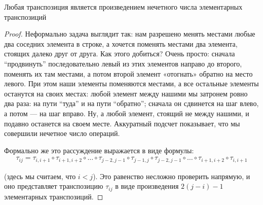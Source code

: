 \begin{theorem-non}
    Любая транспозиция является произведением нечетного числа элементарных транспозиций

    \begin{proof}
        Неформально задача выглядит так: нам разрешено менять местами любые два соседних элемента в строке, а 
        хочется поменять местами два элемента, стоящих далеко друг от друга. Как этого добиться? Очень просто: сначала 
        ``продвинуть'' последовательно левый из этих элементов направо до второго, поменять их там местами, а потом 
        второй элемент «отогнать» обратно на место левого. При этом наши элементы поменяются местами, а все остальные 
        элементы останутся на своих местах: любой элемент между нашими мы затронем ровно два раза: на пути ``туда'' и на 
        пути ``обратно''; сначала он сдвинется на шаг влево, а потом — на шаг вправо. Ну, а любой элемент, стоящий не между 
        нашими, и подавно останется на своем месте. Аккуратный подсчет показывает, что мы совершили нечетное число операций.
        
        Формально же это рассуждение выражается в виде формулы:
        \begin{gather*}
            \tau_{ij} = \tau_{i,i+1} \circ \tau_{i+1,i+2} \circ \dots \circ \tau_{j-2,j-1} \circ \tau_{j-1,j} \circ 
            \tau_{j-2,j-1} \circ \dots \circ \tau_{i+1,i+2} \circ \tau_{i,i+1}
        \end{gather*}

        (здесь мы считаем, что $i < j$). Это равенство несложно проверить напрямую, и оно представляет транспозицию $\tau_{ij}$
        в виде произведения $2(j-i) - 1$ элементарных транспозиций.
    \end{proof}
\end{theorem-non}